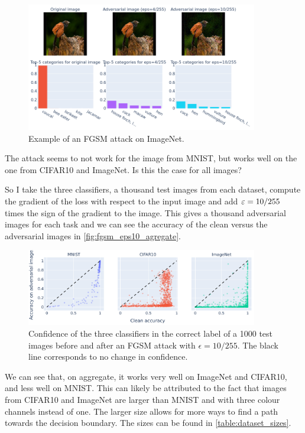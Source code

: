 \documentclass[]{scrarticle}
\begin{document}
\begin{figure}[H]
  \centering
  \includegraphics[width=0.9\textwidth]{../images/fgsm_example_ImageNet.png}
  \caption{Example of an FGSM attack on ImageNet.}
  \label{fig:fgsm_examples_imagenet}
\end{figure}

The attack seems to not work for the image from MNIST, but works well
on the one from CIFAR10 and ImageNet.
Is this the case for all images?

So I take the three classifiers, a thousand test images from each dataset,
compute the gradient of the loss with respect to the input image
and add $\varepsilon = 10 / 255$ times the sign of the gradient to the image.
This gives a thousand adversarial images for each task and
we can see the accuracy of the clean versus the adversarial images
in \autoref{fig:fgsm_eps10_agregate}.

\begin{figure}[H]
  \centering
  \includegraphics[width=0.9\textwidth]{../images/fgsm_strength.png}
  \caption{Confidence of the three classifiers in the correct label of
    a 1000 test images before and after an FGSM attack with $\epsilon = 10 / 255$.
    The black line corresponds to no change in confidence.
  }
  \label{fig:fgsm_eps10_agregate}
\end{figure}

We can see that, on aggregate, it works very well on ImageNet and CIFAR10,
and less well on MNIST. This can likely be attributed to the fact that
images from CIFAR10 and ImageNet are larger than MNIST and with three
colour channels instead of one. The larger size allows for more ways to
find a path towards the decision boundary.
The sizes can be found in \autoref{table:dataset_sizes}.
\end{document}
